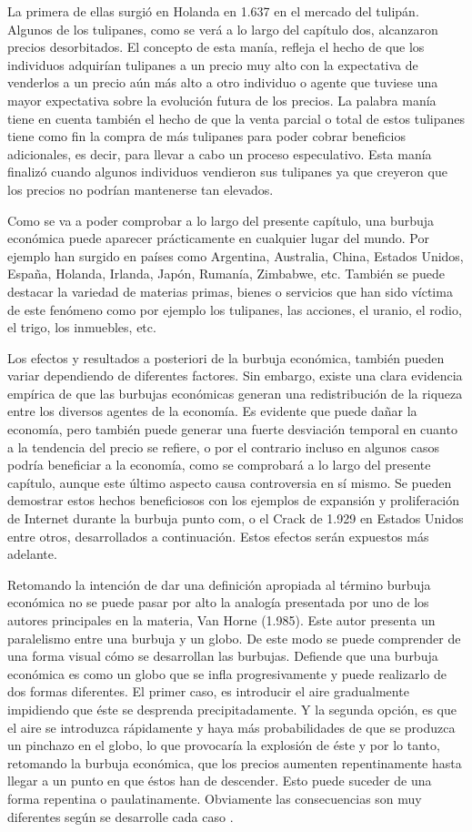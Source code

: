 La primera de ellas surgió en Holanda en 1.637 en el mercado del tulipán. Algunos de los tulipanes, como se verá a lo largo del capítulo dos, alcanzaron precios desorbitados. El concepto de esta manía, refleja el hecho de que los individuos adquirían tulipanes a un precio muy alto con la expectativa de venderlos a un precio aún más alto a otro individuo o agente que tuviese una mayor expectativa sobre la evolución futura de los precios. La palabra manía tiene en cuenta también el hecho de que la venta parcial o total de estos tulipanes tiene como fin la compra de más tulipanes para poder cobrar beneficios adicionales, es decir, para llevar a cabo un proceso especulativo. Esta manía finalizó cuando algunos individuos vendieron sus tulipanes ya que creyeron que los precios no podrían mantenerse tan elevados. 

Como se va a poder comprobar a lo largo del presente capítulo, una burbuja económica puede aparecer prácticamente en cualquier lugar del mundo. Por ejemplo han surgido en países como Argentina, Australia, China, Estados Unidos, España, Holanda, Irlanda, Japón, Rumanía, Zimbabwe, etc. También se puede destacar la variedad de materias primas, bienes o servicios que han sido víctima de este fenómeno como por ejemplo los tulipanes, las acciones, el uranio, el rodio, el trigo, los inmuebles, etc. 

Los efectos y resultados a posteriori de la burbuja económica, también pueden variar dependiendo de diferentes factores. Sin embargo, existe una clara evidencia empírica de que las burbujas económicas generan una redistribución de la riqueza entre los diversos agentes de la economía. Es evidente que puede dañar la economía, pero también puede generar una fuerte desviación temporal en cuanto a la tendencia del precio se refiere, o por el contrario incluso en algunos casos podría beneficiar a la economía, como se comprobará a lo largo del presente capítulo, aunque este último aspecto causa controversia en sí mismo. Se pueden demostrar estos hechos beneficiosos con los ejemplos de expansión y proliferación de Internet durante la burbuja punto com, o el Crack de 1.929 en Estados Unidos entre otros, desarrollados a continuación. Estos efectos serán expuestos más adelante.

Retomando la intención de dar una definición apropiada al término burbuja económica no se puede pasar por alto la analogía presentada por uno de los autores principales en la materia, Van Horne (1.985). Este autor presenta un paralelismo entre una burbuja y un globo. De este modo se puede comprender de una forma visual cómo se desarrollan las burbujas. Defiende que una burbuja económica es como un globo que se infla progresivamente y puede realizarlo de dos formas diferentes. El primer caso, es introducir el aire gradualmente impidiendo que éste se desprenda precipitadamente. Y la segunda opción, es que el aire se introduzca rápidamente y haya más probabilidades de que se produzca un pinchazo en el globo, lo que provocaría la explosión de éste y por lo tanto, retomando la burbuja económica, que los precios aumenten repentinamente hasta llegar a un punto en que éstos han de descender. Esto puede suceder de una forma repentina o paulatinamente. Obviamente las consecuencias son muy diferentes según se desarrolle cada caso
.

